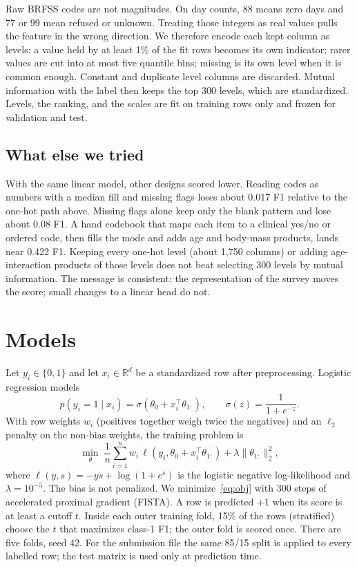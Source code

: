 \documentclass[10pt,conference,compsocconf]{IEEEtran}
\begin{document}
Raw BRFSS codes are not magnitudes.
On day counts, 88 means zero days and 77 or 99 mean refused or unknown.
Treating those integers as real values pulls the feature in the wrong direction.
We therefore encode each kept column as levels:
a value held by at least 1\% of the fit rows becomes its own indicator;
rarer values are cut into at most five quantile bins;
missing is its own level when it is common enough.
Constant and duplicate level columns are discarded.
Mutual information with the label then keeps the top 300 levels, which are
standardized.
Levels, the ranking, and the scales are fit on training rows only and frozen
for validation and test.

\subsection{What else we tried}
With the same linear model, other designs scored lower.
Reading codes as numbers with a median fill and missing flags loses about
0.017 F1 relative to the one-hot path above.
Missing flags alone keep only the blank pattern and lose about 0.08 F1.
A hand codebook that maps each item to a clinical yes/no or ordered code, then
fills the mode and adds age and body-mass products, lands near 0.422 F1.
Keeping every one-hot level (about 1{,}750 columns) or adding age-interaction
products of those levels does not beat selecting 300 levels by mutual information.
The message is consistent: the representation of the survey moves the score;
small changes to a linear head do not.

\section{Models}
Let $y_i\in\{0,1\}$ and let $x_i\in\mathbb{R}^{d}$ be a standardized row after
preprocessing.
Logistic regression models
\begin{equation}
  p(y_i=1\mid x_i)
  =
  \sigma(\theta_0 + x_i^{\top}\theta_{1:})
  ,
  \qquad
  \sigma(z)=\frac{1}{1+e^{-z}}.
\end{equation}
With row weights $w_i$ (positives together weigh twice the negatives) and an
$\ell_2$ penalty on the non-bias weights, the training problem is
\begin{equation}
\label{eq:obj}
\min_{\theta}\;
\frac{1}{n}\sum_{i=1}^{n}
w_i\,\ell\!\left(y_i,\theta_0+x_i^{\top}\theta_{1:}\right)
+\lambda\|\theta_{1:}\|_2^2 ,
\end{equation}
where $\ell(y,s)=-y s+\log(1+e^{s})$ is the logistic negative log-likelihood
and $\lambda=10^{-5}$.
The bias is not penalized.
We minimize~\eqref{eq:obj} with 300 steps of accelerated proximal gradient (FISTA).
A row is predicted $+1$ when its score is at least a cutoff $t$.
Inside each outer training fold, 15\% of the rows (stratified) choose the $t$
that maximizes class-1 F1; the outer fold is scored once.
There are five folds, seed 42.
For the submission file the same 85/15 split is applied to every labelled row;
the test matrix is used only at prediction time.
\end{document}
